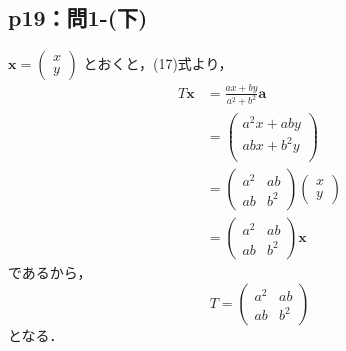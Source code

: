 \documentclass[uplatex,dvipdfmx,a4paper,10pt,fleqn]{jsarticle}
\begin{document}
    \subsection*{p19：問1-(下)}

\begin{tleftbar}
$\bm{x} =
\begin{pmatrix}
x \\
y
\end{pmatrix}
$
とおくと，(17)式より，
\begin{align*}
T \bm{x} &= \frac{ax+by}{a^2+b^2} \bm{a} \\
&=
\begin{pmatrix}
a^2x +aby \\
ab x + b^2y \\
\end{pmatrix}
\\
&=
\begin{pmatrix}
a^2 & ab \\
ab & b^2
\end{pmatrix}
\begin{pmatrix}
x \\
y
\end{pmatrix}
 \\
&= 
\begin{pmatrix}
a^2 & ab \\
ab & b^2
\end{pmatrix}
\bm{x}
\end{align*}
であるから，
\[
T=\begin{pmatrix}
a^2 & ab \\
ab & b^2
\end{pmatrix}
\]
となる．
\end{tleftbar}
%
\newpage
\end{document}
